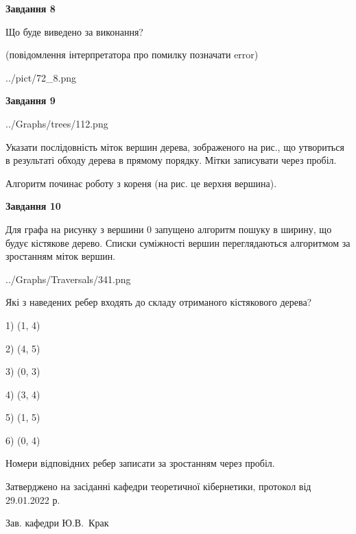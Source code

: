 \documentclass[12pt, ukrainian]{article}
\begin{document}
{\begin {large}
{\begin {center}\textbf{Завдання 8}\end {center}}\par
Що буде виведено за виконання?\par
 (повідомлення інтерпретатора про помилку позначати error)\par
\begin{center}
	{../pict/72_8.png}
\end{center}
\newpage

{\begin {center}\textbf{Завдання 9}\end {center}}\par

\begin{center}
	{../Graphs/trees/112.png}
\end{center}
Указати послідовність міток вершин дерева, зображеного на рис., що утвориться в результаті обходу дерева в прямому порядку. Мітки записувати через пробіл.\par Алгоритм починає роботу з кореня (на рис. це верхня вершина).\par
\newpage

{\begin {center}\textbf{Завдання 10}\end {center}}\par
Для графа на рисунку з вершини 0 запущено алгоритм пошуку в ширину, що будує кістякове дерево. Списки суміжності вершин переглядаються алгоритмом за зростанням міток вершин.\par
\begin{center}
	{../Graphs/Traversals/341.png}
\end{center}
\par Які з наведених ребер входять до складу отриманого кістякового дерева?\par
1) (1, 4)\par
2) (4, 5)\par
3) (0, 3)\par
4) (3, 4)\par
5) (1, 5)\par
6) (0, 4)\par
{\vskip 15pt} Номери відповідних ребер записати за зростанням через пробіл.\par
\newpage


\end {large}
}
{\smallskip \begin {small} Затверджено на засіданні кафедри теоретичної кібернетики, протокол  від   29.01.2022 р.\par\smallskip\smallskip
{\parbox {6.5 cm}{Зав. кафедри \dotfill Ю.В.~Крак}} \end{small}}
\end{document}
